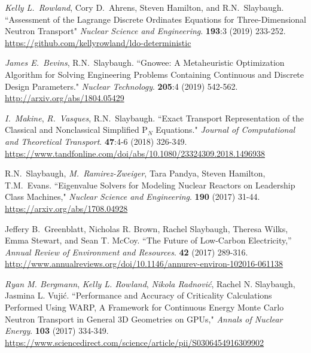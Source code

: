 \begin{bibsection}
\item \textit{Kelly L.\ Rowland}, Cory D.\ Ahrens, Steven Hamilton, and R.N.\ Slaybaugh. ``Assessment of the Lagrange Discrete Ordinates Equations for Three-Dimensional Neutron Transport"  \textit{Nuclear Science and Engineering}. \textbf{193}:3 (2019) 233-252.\\
\url{https://github.com/kellyrowland/ldo-deterministic}

\item \textit{James E.\ Bevins}, R.N.\ Slaybaugh. ``Gnowee: A Metaheuristic Optimization Algorithm for Solving Engineering Problems Containing Continuous and Discrete Design Parameters." \textit{Nuclear Technology}. \textbf{205}:4 (2019) 542-562.\\
\url{http://arxiv.org/abs/1804.05429}

\item \textit{I.\ Makine}, \textit{R.\ Vasques}, R.N.\ Slaybaugh. ``Exact Transport Representation of the Classical and Nonclassical Simplified P$_N$ Equations." \textit{Journal of Computational and Theoretical Transport}. \textbf{47}:4-6 (2018) 326-349.\\
\url{https://www.tandfonline.com/doi/abs/10.1080/23324309.2018.1496938}

\item R.N.\ Slaybaugh, \textit{M.\ Ramirez-Zweiger}, Tara Pandya, Steven Hamilton, T.M.\ Evans. ``Eigenvalue Solvers for Modeling Nuclear Reactors on Leadership Class Machines," \textit{Nuclear Science and Engineering}. \textbf{190} (2017) 31-44.\\
\url{https://arxiv.org/abs/1708.04928}

\item Jeffery B.\ Greenblatt, Nicholas R. Brown, Rachel Slaybaugh, Theresa Wilks, Emma Stewart, and Sean T. McCoy. ``The Future of Low-Carbon Electricity,'' \textit{Annual Review of Environment and Resources}. \textbf{42} (2017) 289-316. \\
\url{http://www.annualreviews.org/doi/10.1146/annurev-environ-102016-061138}

\item \textit{Ryan M. Bergmann}, \textit{Kelly L. Rowland}, \textit{Nikola Radnovi\'c}, Rachel N. Slaybaugh, Jasmina L. Vuji\'c. ``Performance and Accuracy of Criticality Calculations Performed Using WARP, A Framework for Continuous Energy Monte Carlo Neutron Transport in General 3D Geometries on GPUs," \textit{Annals of Nuclear Energy}. \textbf{103} (2017) 334-349.\\
\url{https://www.sciencedirect.com/science/article/pii/S0306454916309902}


\end{bibsection}
